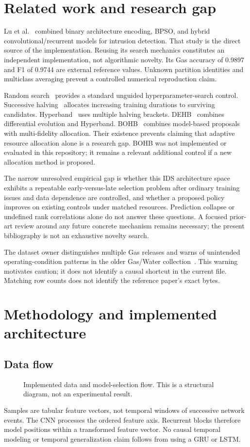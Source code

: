 \documentclass[11pt,a4paper]{report}
\begin{document}
\chapter{Related work and research gap}
Lu et al.~\cite{lu2025} combined binary architecture encoding, BPSO, and hybrid convolutional/recurrent models for intrusion detection. That study is the direct source of the implementation. Reusing its search mechanics constitutes an independent implementation, not algorithmic novelty. Its Gas accuracy of 0.9897 and F1 of 0.9744 are external reference values. Unknown partition identities and multiclass averaging prevent a controlled numerical reproduction claim.

Random search~\cite{bergstra2012} provides a standard unguided hyperparameter-search control. Successive halving~\cite{jamieson2016} allocates increasing training durations to surviving candidates. Hyperband~\cite{li2018} uses multiple halving brackets. DEHB~\cite{awad2021} combines differential evolution and Hyperband. BOHB~\cite{falkner2018} combines model-based proposals with multi-fidelity allocation. Their existence prevents claiming that adaptive resource allocation alone is a research gap. BOHB was not implemented or evaluated in this repository; it remains a relevant additional control if a new allocation method is proposed.

The narrow unresolved empirical gap is whether this IDS architecture space exhibits a repeatable early-versus-late selection problem after ordinary training issues and data dependence are controlled, and whether a proposed policy improves on existing controls under matched resources. Prediction collapse or undefined rank correlations alone do not answer these questions. A focused prior-art review around any future concrete mechanism remains necessary; the present bibliography is not an exhaustive novelty search.

The dataset owner distinguishes multiple Gas releases and warns of unintended operating-condition patterns in the older Gas/Water collection~\cite{morrisdata}. This warning motivates caution; it does not identify a causal shortcut in the current file. Matching row counts does not identify the reference paper's exact bytes.

\chapter{Methodology and implemented architecture}
\section{Data flow}
\begin{figure}[htbp]\centering
\caption{Implemented data and model-selection flow. This is a structural diagram, not an experimental result.}\end{figure}
Samples are tabular feature vectors, not temporal windows of successive network events. The CNN processes the ordered feature axis. Recurrent blocks therefore model positions within a transformed feature vector. No causal temporal modeling or temporal generalization claim follows from using a GRU or LSTM.
\end{document}
